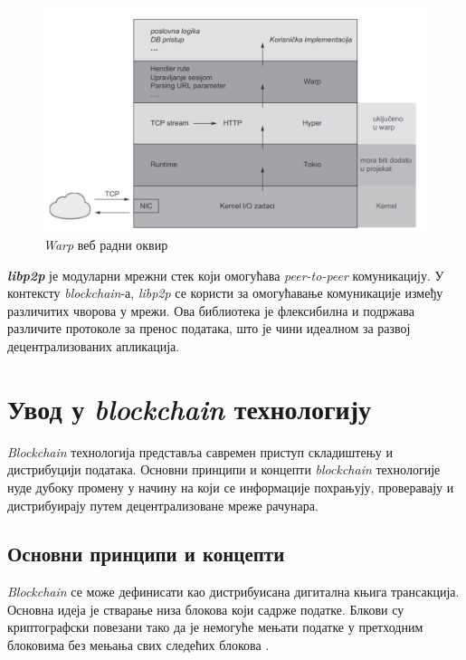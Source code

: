 \documentclass[12pt, a4paper]{article}
\begin{document}
\begin{figure}[h]
    \centering
    \includegraphics[width=1\linewidth]{slike/warp.png}
    \caption{\textit{Warp} веб радни оквир}
    \label{fig:2.1}
\end{figure}

\textit{\textbf{libp2p}} је модуларни мрежни стек који омогућава \textit{peer-to-peer} комуникацију. У контексту \textit{blockchain}-а, \textit{libp2p} се користи за омогућавање комуникације између различитих чворова у мрежи. Ова библиотека је флексибилна и подржава различите протоколе за пренос података, што је чини идеалном за развој децентрализованих апликација.

\pagebreak

\section{Увод у \textit{blockchain} технологију}
\textit{Blockchain} технологија представља савремен приступ складиштењу и дистрибуцији података. Основни принципи и концепти \textit{blockchain} технологије нуде дубоку промену у начину на који се информације похрањују, проверавају и дистрибуирају путем децентрализоване мреже рачунара.

\subsection{Основни принципи и концепти}
\textit{Blockchain} се може дефинисати као дистрибуисана дигитална књига трансакција. Основна идеја је стварање низа блокова који садрже податке. Блкови су криптографски повезани тако да је немогуће мењати податке у претходним блоковима без мењања свих следећих блокова \cite{8}. 
\end{document}
